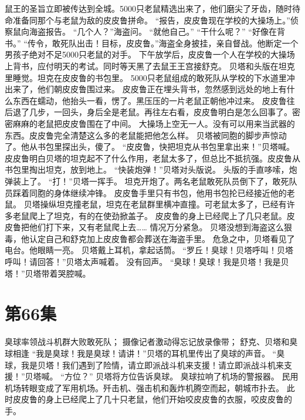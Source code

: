 \documentclass[a4paper,12pt,UTF8,twoside]{ctexbook}
\begin{document}
        鼠王的圣旨立即被传达到全城。5000只老鼠精选出来了，他们磨尖了牙齿，随时待命准备同那个与老鼠为敌的皮皮鲁拼命。 
        “报告，皮皮鲁现在学校的大操场上。”侦察鼠向海盗报告。 
        “几个人？”海盗问。 
        “就他自己。” 
        “干什么呢？” 
        “好像在背书。” 
        “传令，敢死队出击！目标，皮皮鲁。”海盗全身披挂，亲自督战。他断定一个男孩子绝对不足5000只老鼠的对手。 
        下午放学后，皮皮鲁一个人在学校的大操场上背书，应付明天的考试。同时等天黑了去鼠王王宫接舒克。 
        贝塔和头版在坦克里睡觉。坦克在皮皮鲁的书包里。 
        5000只老鼠组成的敢死队从学校的下水道里冲出来了，他们朝皮皮鲁围过来。 
        皮皮鲁正在埋头背书，忽然感到远处的地上有什么东西在蠕动，他抬头一看，愣了。黑压压的一片老鼠正朝他冲过来。 
        皮皮鲁往后退了几步，一回头，身后全是老鼠。再往左右看，皮皮鲁明白是怎么回事了。密密麻麻的老鼠把皮皮鲁围在了中间。 
        大操场上空无一人。没有可以用来当武器的东西。皮皮鲁完全清楚这么多的老鼠能把他怎么样。 
        贝塔被同胞的脚步声惊动了。他从书包里探出头，傻了。 
        “皮皮鲁，快把坦克从书包里拿出来！”贝塔喊。 
        皮皮鲁明白贝塔的坦克起不了什么作用，老鼠太多了，但总比不抵抗强。皮皮鲁从书包里掏出坦克，放到地上。 
        “快装炮弹！”贝塔对头版说。 
        头版的手直哆嗦，炮弹装上了。 
        “打！”贝塔一挥手。 
        坦克开炮了。两名老鼠敢死队员倒下了，敢死队员踩着同胞的身体继续冲锋。 
        皮皮鲁手里只有书包，他用书包抡已经接近他的老鼠。 
        贝塔操纵坦克撞老鼠，坦克在老鼠群里横冲直撞。可老鼠太多了，已经有许多老鼠爬上了坦克，有的在使劲掀盖子。 
        皮皮鲁的身上已经爬上了几只老鼠。皮皮鲁把他们打下来，又有老鼠爬上去…… 
        情况万分紧急。 
        贝塔没想到海盗这么狠毒，他认定自己和舒克加上皮皮鲁都会葬送在海盗手里。 
        危急之中，贝塔看见了电台。他眼睛一亮。 
        贝塔戴上耳机，拿起话筒。 
        “罗丘！臭球！贝塔呼叫！贝塔呼叫！请回答！”贝塔太声喊着。 
        没有回声。 
        “臭球！臭球！我是贝塔！我是贝塔！”贝塔带着哭腔喊。   \chapter{第66集} 
        臭球率领战斗机群大败敢死队； 
        摄像记者激动得忘记放录像带； 
        舒克、贝塔和臭球相逢   
        “我是臭球！我是臭球！请讲！”贝塔的耳机里传出了臭球的声音。 
        “臭球，我是贝塔！我们遇到了险情，请立即派战斗机来支援！请立即派战斗机来支援！”贝塔喊。 
        “方位？” 
        贝塔将方位告诉臭球。 
        臭球拉响了机场的警报器。 
        民用机场转眼变成了军用机场。歼击机、强击机和轰炸机腾空而起，朝城市扑去。 
        此时皮皮鲁的身上已经爬上了几十只老鼠，他们开始咬皮皮鲁的衣服，咬皮皮鲁的手。 
\end{document}

